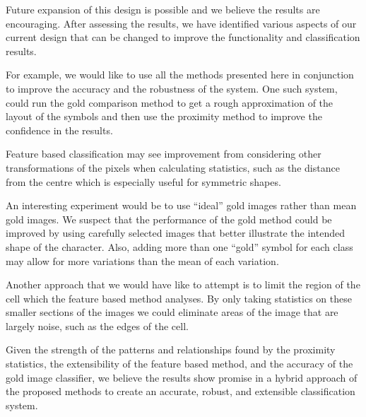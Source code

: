 
Future expansion of this design is possible and we believe the results are
encouraging.  After assessing the results, we have identified various aspects
of our current design that can be changed to improve the functionality and
classification results.

For example, we would like to use all the methods presented here in conjunction
to improve the accuracy and the robustness of the system.  One such system,
could run the gold comparison method to get a rough approximation of the layout
of the symbols and then use the proximity method to improve the confidence in
the results.

Feature based classification may see improvement from considering other
transformations of the pixels when calculating statistics, such as the distance
from the centre which is especially useful for symmetric shapes.

An interesting experiment would be to use ``ideal'' gold images rather than
mean gold images. We suspect that the performance of the gold method could be
improved by using carefully selected images that better illustrate the intended
shape of the character. Also, adding more than one ``gold'' symbol for each
class may allow for more variations than the mean of each variation.

Another approach that we would have like to attempt is to limit the region of
the cell which the feature based method analyses.  By only taking statistics on
these smaller sections of the images we could eliminate areas of the image that
are largely noise, such as the edges of the cell.

Given the strength of the patterns and relationships found by the proximity
statistics, the extensibility of the feature based method, and the accuracy of
the gold image classifier, we believe the results show promise in a hybrid
approach of the proposed methods to create an accurate, robust, and extensible
classification system.


